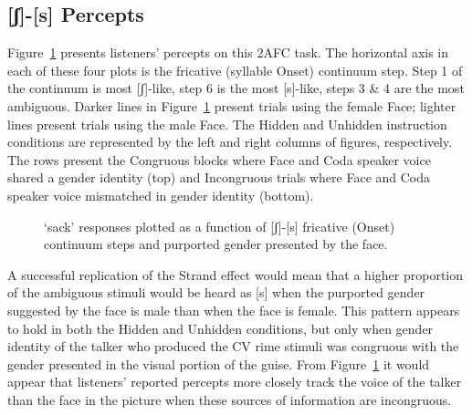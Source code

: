 \documentclass[
  letterpaper,
  DIV=11,
  numbers=noendperiod]{scrartcl}
\begin{document}
\subsection{{[}ʃ{]}-{[}s{]} Percepts}\label{sub-results-fricative}

Figure~\ref{fig-scurve} presents listeners' percepts on this 2AFC task.
The horizontal axis in each of these four plots is the fricative
(syllable Onset) continuum step. Step 1 of the continuum is most
{[}ʃ{]}-like, step 6 is the most {[}s{]}-like, steps 3 \& 4 are the most
ambiguous. Darker lines in Figure~\ref{fig-scurve} present trials using
the female Face; lighter lines present trials using the male Face. The
Hidden and Unhidden instruction conditions are represented by the left
and right columns of figures, respectively. The rows present the
Congruous blocks where Face and Coda speaker voice shared a gender
identity (top) and Incongruous trials where Face and Coda speaker voice
mismatched in gender identity (bottom).

\begin{figure}


\caption{\label{fig-scurve}`sack' responses plotted as a function of
{[}ʃ{]}-{[}s{]} fricative (Onset) continuum steps and purported gender
presented by the face.}

\end{figure}%

A successful replication of the Strand effect would mean that a higher
proportion of the ambiguous stimuli would be heard as {[}s{]} when the
purported gender suggested by the face is male than when the face is
female. This pattern appears to hold in both the Hidden and Unhidden
conditions, but only when gender identity of the talker who produced the
CV rime stimuli was congruous with the gender presented in the visual
portion of the guise. From Figure~\ref{fig-scurve} it would appear that
listeners' reported percepts more closely track the voice of the talker
than the face in the picture when these sources of information are
incongruous.
\end{document}
